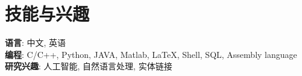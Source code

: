 \section{技能与兴趣}
\textbf{语言}: 中文, 英语\\
\textbf{编程}: C/C++, Python, JAVA, Matlab, LaTeX, Shell, SQL, Assembly language\\
\textbf{研究兴趣}: 人工智能, 自然语言处理, 实体链接
